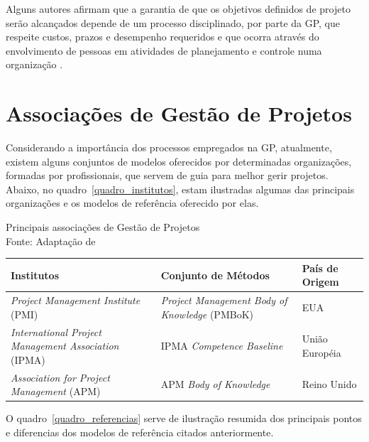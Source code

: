   Alguns autores afirmam que a garantia de que os objetivos definidos de projeto serão alcançados depende de um processo disciplinado, por parte da GP, que respeite custos, prazos e desempenho requeridos e que ocorra através do envolvimento de pessoas em atividades de planejamento e controle numa organização \cite{dinsmore2009ama, meredith2011project}.

\section{Associações de Gestão de Projetos}

  Considerando a importância dos processos empregados na GP, atualmente, existem alguns conjuntos de modelos oferecidos por determinadas organizações, formadas por profissionais, que servem de guia para melhor gerir projetos. Abaixo, no quadro~\ref{quadro_institutos}, estam ilustradas algumas das principais organizações e os modelos de referência oferecido por elas.

  \begin{quadro}[!h]
    \centering
    \caption{Principais associações de Gestão de Projetos \\ Fonte: Adaptação de  \label{quadro_institutos}}
    \begin{tabular}{| m{} m{} m{}|}
      \hline
      \textbf{Institutos} & \textbf{Conjunto de Métodos} & \textbf{País de Origem} \\
      \hline \hline
      \textit{Project Management Institute} (PMI) & \textit{Project Management Body of Knowledge} (PMBoK) & EUA \\ \hline
      \textit{International Project Management Association} (IPMA) & IPMA \textit{Competence Baseline} & União Européia \\ \hline
      \textit{Association for Project Management} (APM) & APM \textit{Body of Knowledge} & Reino Unido \\ \hline
    \end{tabular}
  \end{quadro}

  O quadro~\ref{quadro_referencias} serve de ilustração resumida dos principais pontos e diferencias dos modelos de referência citados anteriormente.

